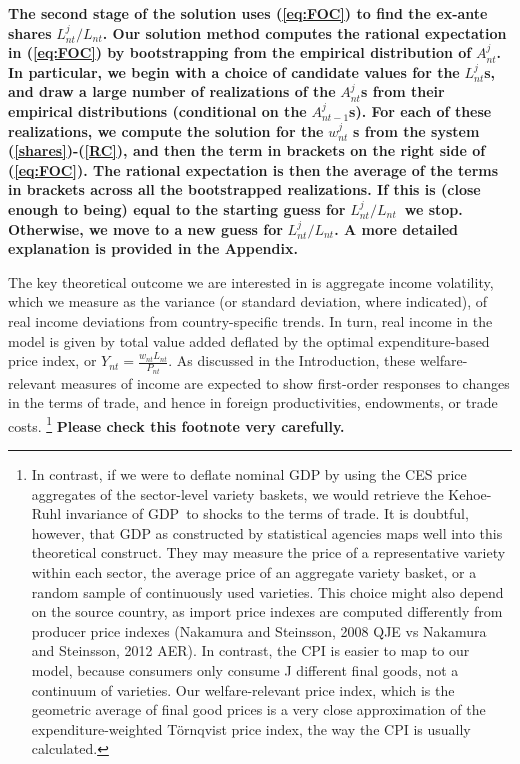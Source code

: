 \documentclass[12pt]{article}
\begin{document}
\textbf{The second stage of the solution uses (\ref{eq:FOC}) to find the
ex-ante shares }$L_{nt}^{j}/L_{nt}$\textbf{. Our solution method computes
the rational expectation in (\ref{eq:FOC}) by bootstrapping from the
empirical distribution of }$A_{nt}^{j}$\textbf{. In particular, we begin
with a choice of candidate values for the }$L_{nt}^{j}$\textbf{s, and draw a
large number of realizations of the }$A_{nt}^{j}$\textbf{s from their
empirical distributions (conditional on the }$A_{nt-1}^{j}$\textbf{s). For
each of these realizations, we compute the solution for the }$w_{nt}^{j}$%
\textbf{s from the system (\ref{shares})-(\ref{RC}), and then the term in
brackets on the right side of (\ref{eq:FOC}). The rational expectation is
then the average of the terms in brackets across all the bootstrapped
realizations. If this is (close enough to being) equal to the starting guess
for }$L_{nt}^{j}/L_{nt}$\textbf{\ we stop. Otherwise, we move to a new guess
for }$L_{nt}^{j}/L_{nt}$\textbf{. A more detailed explanation is provided in
the Appendix.}

The key theoretical outcome we are interested in is aggregate income
volatility, which we measure as the variance (or standard deviation, where
indicated), of real income deviations from country-specific trends. In turn,
real income in the model is given by total value added deflated by the
optimal expenditure-based price index, or $Y_{nt}=\frac{w_{nt}L_{nt}}{P_{nt}}%
.$ As discussed in the Introduction, these welfare-relevant measures of
income are expected to show first-order responses to changes in the terms of
trade, and hence in foreign productivities, endowments, or trade costs.%
\footnote{%
In contrast, if we were to deflate nominal GDP by using the CES price
aggregates of the sector-level variety baskets, we would retrieve the
Kehoe-Ruhl invariance of GDP\ to shocks to the terms of trade. It is
doubtful, however, that GDP as constructed by statistical agencies maps well
into this theoretical construct. They may measure the price of a
representative variety within each sector, the average price of an aggregate
variety basket, or a random sample of continuously used varieties. This
choice might also depend on the source country, as import price indexes are
computed differently from producer price indexes (Nakamura and Steinsson,
2008 QJE vs Nakamura and Steinsson, 2012 AER). In contrast, the CPI is
easier to map to our model, because consumers only consume J different final
goods, not a continuum of varieties. Our welfare-relevant price index, which
is the geometric average of final good prices is a very close approximation
of the expenditure-weighted T\"{o}rnqvist price index, the way the CPI is
usually calculated.} \textbf{Please check this footnote very carefully.}
\end{document}

